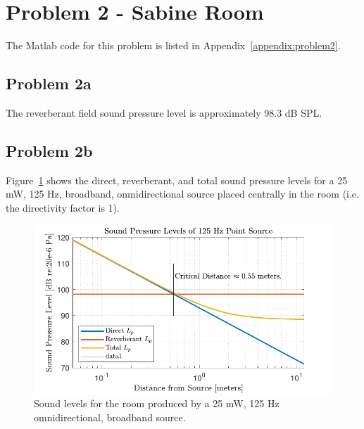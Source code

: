 {\newpage
\section*{Problem 2 - Sabine Room}

The Matlab code for this problem is listed in Appendix~\ref{appendix:problem2}.


\vspace{0.25cm}
\subsection*{Problem 2a}

The reverberant field sound pressure level is approximately 98.3 dB SPL.




\vspace{0.25cm}
\subsection*{Problem 2b}

Figure~\ref{figure:sabineRoomLevels} shows the direct, reverberant, and total sound pressure levels for a 25 mW, 125 Hz, broadband, omnidirectional source placed centrally in the room (i.e. the directivity factor is 1).

\begin{figure}[htb!]
    \center
        \includegraphics[scale = 1.0, keepaspectratio]{Sabine Room.pdf}
    \vspace{0.25cm}        
    \caption{Sound levels for the room produced by a 25 mW, 125 Hz omnidirectional, broadband source.}
    \label{figure:sabineRoomLevels}
\end{figure}






}
